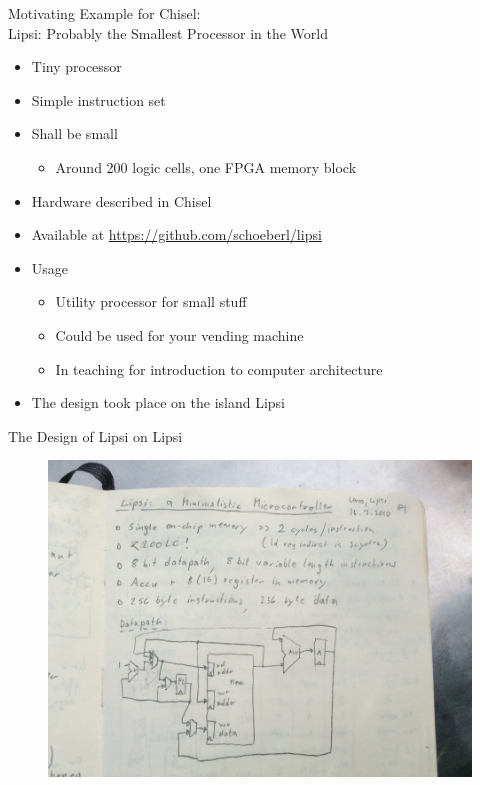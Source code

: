 \documentclass[xcolor=pdflatex,dvipsnames,table]{beamer}
\begin{document}
\begin{frame}[fragile]{Motivating Example for Chisel:\\
Lipsi: Probably the Smallest Processor in the World}
\begin{itemize}
\item Tiny processor
\item Simple instruction set
\item Shall be small
\begin{itemize}
\item Around 200 logic cells, one FPGA memory block
\end{itemize}
\item Hardware described in Chisel
\item Available at \url{https://github.com/schoeberl/lipsi}
\item Usage
\begin{itemize}
\item Utility processor for small stuff
\item Could be used for your vending machine
\item In teaching for introduction to computer architecture
\end{itemize}
\item The design took place on the island Lipsi
\end{itemize}
\end{frame}

\begin{frame}[fragile]{The Design of Lipsi on Lipsi}
\begin{figure}
    \centering
    \includegraphics[scale=0.3]{../slides-tutorial/lipsi}
\end{figure}
\end{frame}
\end{document}
